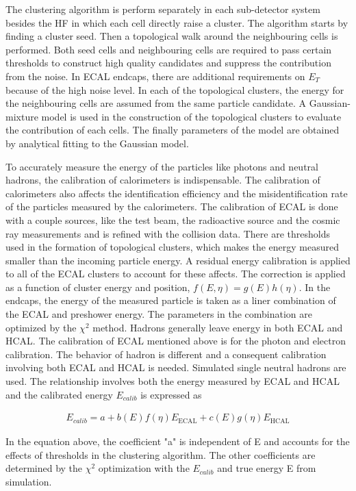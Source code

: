 The clustering algorithm is perform separately in each sub-detector system besides the HF in which each cell directly raise a cluster. The algorithm starts by finding a cluster seed. Then a topological walk around the neighbouring cells is performed. Both seed cells and neighbouring cells are required to pass certain thresholds to construct high quality candidates and suppress the contribution from the noise. In ECAL endcaps, there are additional requirements on $E_{T}$ because of the high noise level. In each of the topological clusters, the energy for the neighbouring cells are assumed from the same particle candidate. A Gaussian-mixture model is used in the construction of the topological clusters to evaluate the contribution of each cells. The finally parameters of the model are obtained by analytical fitting to the Gaussian model.

To accurately measure the energy of the particles like photons and neutral hadrons, the calibration of calorimeters is indispensable. The calibration of calorimeters also affects the identification efficiency and the misidentification rate of the particles measured by the calorimeters. The calibration of ECAL is done with a couple sources, like the test beam, the radioactive source and the cosmic ray measurements and is refined with the collision data. There are thresholds used in the formation of topological clusters, which makes the energy measured smaller than the incoming particle energy. A residual energy calibration is applied to all of the ECAL clusters to account for these affects.  The correction is applied as a function of cluster energy and position, $f(E,\eta)=g(E)h(\eta)$. In the endcaps, the energy of the measured particle is taken as a liner combination of the ECAL and preshower energy. The parameters in the combination are optimized by the $\chi^{2}$ method. Hadrons generally leave energy in both ECAL and HCAL. The calibration of ECAL mentioned above is for the photon and electron calibration. The behavior of hadron is different and a consequent calibration involving both ECAL and HCAL is needed. Simulated single neutral hadrons are used. The relationship involves both the energy measured by ECAL and HCAL and the calibrated energy $E_{calib}$ is expressed as

\begin{align*}
E_{calib}=a+b(E)f(\eta)E_{\textrm{ECAL}}+c(E)g(\eta)E_{\textrm{HCAL}}
\end{align*}

In the equation above, the coefficient "a" is independent of E and accounts for the effects of thresholds in the clustering algorithm. The other coefficients are determined by the $\chi^{2}$ optimization with the $E_{calib}$ and true energy E from simulation. 


